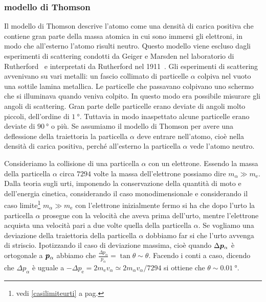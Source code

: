 \subsubsection{modello di Thomson}
Il modello di Thomson descrive l'atomo come una densità di carica positiva che contiene gran parte della massa atomica in cui sono immersi gli elettroni, in modo che all'esterno l'atomo risulti neutro. Questo modello viene escluso dagli esperimenti di scattering condotti da Geiger e Marsden nel laboratorio di Rutherford~\cite{geiger1909} e interpretati da Rutherford nel 1911~\cite{rutherford1911}.  Gli esperimenti di scattering avvenivano su vari metalli: un fascio collimato di particelle $\alpha$ colpiva nel vuoto una sottile lamina metallica. Le particelle che passavano colpivano uno schermo che si illuminava quando veniva colpito. In questo modo era possibile misurare gli angoli di scattering. Gran parte delle particelle erano deviate di angoli molto piccoli, dell'ordine di $\SI{1}{\degree}$. Tuttavia in modo inaspettato alcune particelle erano deviate di $\SI{90}{\degree}$ o più. Se assumiamo il modello di Thomson per avere una deflessione della traiettoria la particella $\alpha$ deve entrare nell'atomo, cioè nella densità di carica positiva, perché all'esterno la particella $\alpha$ vede l'atomo neutro.

Consideriamo la collisione di una particella $\alpha$ con un elettrone. Essendo la massa della particella $\alpha$ circa $7294$ volte la massa dell'elettrone possiamo dire $m_\alpha\gg m_{\mathrm{e}}$. Dalla teoria sugli urti, imponendo la conservazione della quantità di moto e dell'energia cinetica, considerando il caso monodimensionale e considerando il caso limite\footnote{vedi \ref{casilimiteurti} a pag.\@\pageref{casilimiteurti}} $m_\alpha\gg m_{\mathrm{e}}$ con l'elettrone inizialmente fermo si ha che dopo l'urto la particella $\alpha$ prosegue con la velocità che aveva prima dell'urto, mentre l'elettrone acquista una velocità pari a due volte quella della particella $\alpha$. Se vogliamo una deviazione della traiettoria della particella $\alpha$ dobbiamo far si che l'urto avvenga di striscio. Ipotizzando il caso di deviazione massima, cioè quando $\Delta \boldsymbol{p}_\alpha$ è ortogonale a $\boldsymbol{p}_\alpha$ abbiamo che $\frac{\Delta p_\alpha}{p_\alpha}=\tan\theta\sim\theta$. Facendo i conti a caso, dicendo che $\Delta p_\alpha$ è uguale a $-\Delta p_\mathrm{e}=2m_\mathrm{e}v_\alpha\simeq 2m_\alpha v_\alpha/7294$ si ottiene che $\theta\sim \SI{0.01}{\degree}$.

